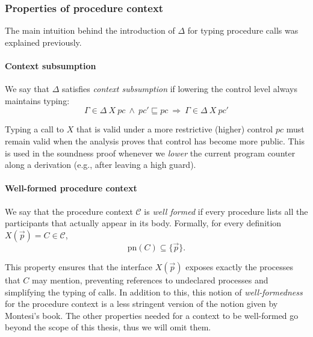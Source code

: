 \documentclass[12pt,a4paper,twoside]{book}
\newcommand{\pn}{\mathrm{pn}}
\begin{document}
\subsubsection{Properties of procedure context}
The main intuition behind the introduction of $\Delta$ for typing procedure calls was explained previously.

\paragraph{Context subsumption}
We say that \(\Delta\) satisfies \emph{context subsumption} if lowering the control level always maintains typing:
\begin{equation}\label{ass:ctx_sub}
  \Gamma \in \Delta~X~pc\ \wedge\ pc' \sqsubseteq pc
  \ \Longrightarrow\
  \Gamma \in \Delta~X~pc'
\end{equation}

Typing a call to \(X\) that is valid under a more restrictive (higher) control
  \(pc\) must remain valid when the analysis proves that control has become more public.
  This is used in the soundness proof whenever we \emph{lower} the current program counter along a derivation (e.g., after leaving a high guard).

\paragraph{Well-formed procedure context}
\label{ass:wellf_ctx}
We say that the procedure context \(\mathscr{C}\) is \emph{well formed} if every procedure lists all the participants that actually appear in its body. Formally, for every definition \(X(\vec{p}) = C \in \mathscr{C}\),
\[
  \pn(C) \subseteq \{\vec{p}\}.
\]

This property ensures that the interface \(X(\vec{p})\) exposes exactly the processes that \(C\) may mention, preventing references to undeclared processes and simplifying the typing of calls. In addition to this, this notion of \emph{well-formedness} for the procedure context is a less stringent version of the notion given by Montesi's book\cite{montesi2023introduction}.
The other properties needed for a context to be well-formed go beyond the scope of this thesis, thus we will omit them.
\end{document}
